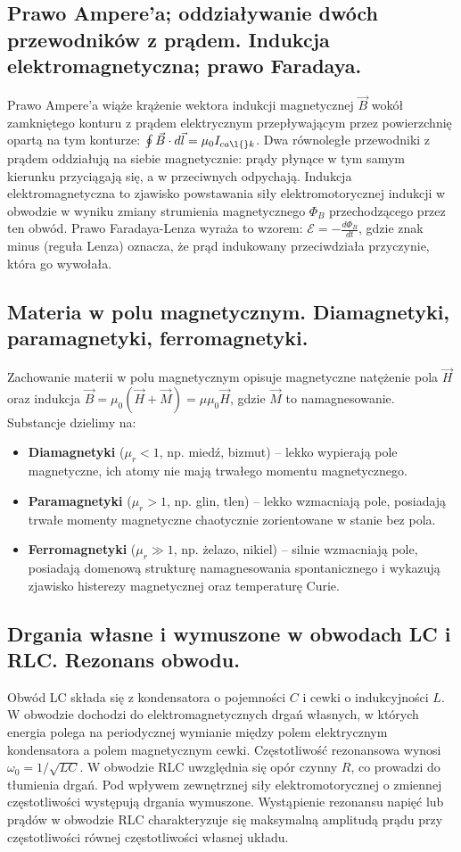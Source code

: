 \documentclass[11pt,a4paper]{article}
\begin{document}
\subsection{Prawo Ampere'a; oddziaływanie dwóch przewodników z prądem. Indukcja elektromagnetyczna; prawo Faradaya.}
Prawo Ampere'a wiąże krążenie wektora indukcji magnetycznej $\vec{B}$ wokół zamkniętego konturu z prądem elektrycznym przepływającym przez powierzchnię opartą na tym konturze: $\oint \vec{B} \cdot d\vec{l} = \mu_0 I_{ca\l{}k}$. Dwa równoległe przewodniki z prądem oddziałują na siebie magnetycznie: prądy płynące w tym samym kierunku przyciągają się, a w przeciwnych odpychają. Indukcja elektromagnetyczna to zjawisko powstawania siły elektromotorycznej indukcji w obwodzie w wyniku zmiany strumienia magnetycznego $\Phi_B$ przechodzącego przez ten obwód. Prawo Faradaya-Lenza wyraża to wzorem: $\mathcal{E} = -\frac{d\Phi_B}{dt}$, gdzie znak minus (reguła Lenza) oznacza, że prąd indukowany przeciwdziała przyczynie, która go wywołała.

\subsection{Materia w polu magnetycznym. Diamagnetyki, paramagnetyki, ferromagnetyki.}
Zachowanie materii w polu magnetycznym opisuje magnetyczne natężenie pola $\vec{H}$ oraz indukcja $\vec{B} = \mu_0(\vec{H} + \vec{M}) = \mu \mu_0 \vec{H}$, gdzie $\vec{M}$ to namagnesowanie. Substancje dzielimy na:
\begin{itemize}
    \item \textbf{Diamagnetyki} ($\mu_r < 1$, np. miedź, bizmut) -- lekko wypierają pole magnetyczne, ich atomy nie mają trwałego momentu magnetycznego.
    \item \textbf{Paramagnetyki} ($\mu_r > 1$, np. glin, tlen) -- lekko wzmacniają pole, posiadają trwałe momenty magnetyczne chaotycznie zorientowane w stanie bez pola.
    \item \textbf{Ferromagnetyki} ($\mu_r \gg 1$, np. żelazo, nikiel) -- silnie wzmacniają pole, posiadają domenową strukturę namagnesowania spontanicznego i wykazują zjawisko histerezy magnetycznej oraz temperaturę Curie.
\end{itemize}

\subsection{Drgania własne i wymuszone w obwodach LC i RLC. Rezonans obwodu.}
Obwód LC składa się z kondensatora o pojemności $C$ i cewki o indukcyjności $L$. W obwodzie dochodzi do elektromagnetycznych drgań własnych, w których energia polega na periodycznej wymianie między polem elektrycznym kondensatora a polem magnetycznym cewki. Częstotliwość rezonansowa wynosi $\omega_0 = 1/\sqrt{LC}$. W obwodzie RLC uwzględnia się opór czynny $R$, co prowadzi do tłumienia drgań. Pod wpływem zewnętrznej siły elektromotorycznej o zmiennej częstotliwości występują drgania wymuszone. Wystąpienie rezonansu napięć lub prądów w obwodzie RLC charakteryzuje się maksymalną amplitudą prądu przy częstotliwości równej częstotliwości własnej układu.
\end{document}
